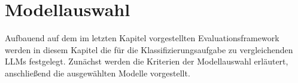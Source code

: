 \chapter{Modellauswahl}\label{ch:modellauswahl}

Aufbauend auf dem im letzten Kapitel vorgestellten Evaluationsframework werden in diesem Kapitel die für die Klassifizierungsaufgabe zu vergleichenden \acp{LLM} festgelegt. Zunächst werden die Kriterien der Modellauswahl erläutert, anschließend die ausgewählten Modelle vorgestellt.


